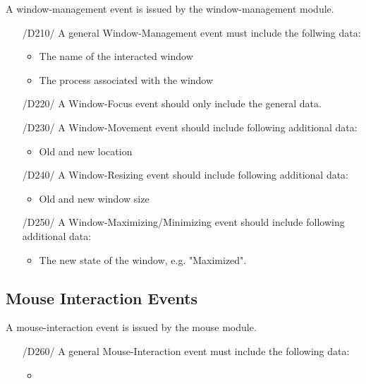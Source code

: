 A window-management event is issued by the window-management module.

\begin{itemize}
\item[/D210/] A general Window-Management event must include the follwing data:
	\begin{itemize}
	\item The name of the interacted window
	\item The process associated with the window
	\end{itemize}

\item[/D220/] A Window-Focus event should only include the general data.

\item[/D230/] A Window-Movement event should include following additional data:
	\begin{itemize}
	\item Old and new location
	\end{itemize}
	
\item[/D240/] A Window-Resizing event should include following additional data:
	\begin{itemize}
	\item Old and new window size
	\end{itemize}
	
\item[/D250/] A Window-Maximizing/Minimizing event should include following additional data:
	\begin{itemize}
	\item The new state of the window, e.g. "Maximized".
	\end{itemize}
\end{itemize}

\subsection{Mouse Interaction Events}

A mouse-interaction event is issued by the mouse module.

\begin{itemize}
\item[/D260/] A general Mouse-Interaction event must include the following data:
	\begin{itemize}
	\item 
	\end{itemize}
\end{itemize}

